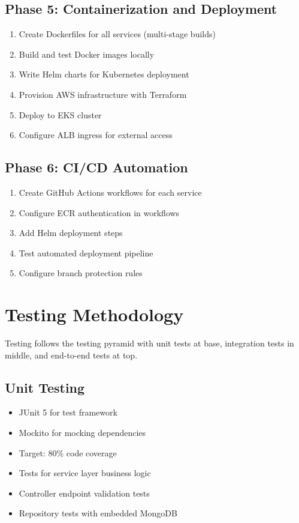 \subsection{Phase 5: Containerization and Deployment}

\begin{enumerate}
    \item Create Dockerfiles for all services (multi-stage builds)
    \item Build and test Docker images locally
    \item Write Helm charts for Kubernetes deployment
    \item Provision AWS infrastructure with Terraform
    \item Deploy to EKS cluster
    \item Configure ALB ingress for external access
\end{enumerate}

\subsection{Phase 6: CI/CD Automation}

\begin{enumerate}
    \item Create GitHub Actions workflows for each service
    \item Configure ECR authentication in workflows
    \item Add Helm deployment steps
    \item Test automated deployment pipeline
    \item Configure branch protection rules
\end{enumerate}

\section{Testing Methodology}

Testing follows the testing pyramid with unit tests at base, integration tests in middle, and end-to-end tests at top.

\subsection{Unit Testing}

\begin{itemize}
    \item JUnit 5 for test framework
    \item Mockito for mocking dependencies
    \item Target: 80\% code coverage
    \item Tests for service layer business logic
    \item Controller endpoint validation tests
    \item Repository tests with embedded MongoDB
\end{itemize}

